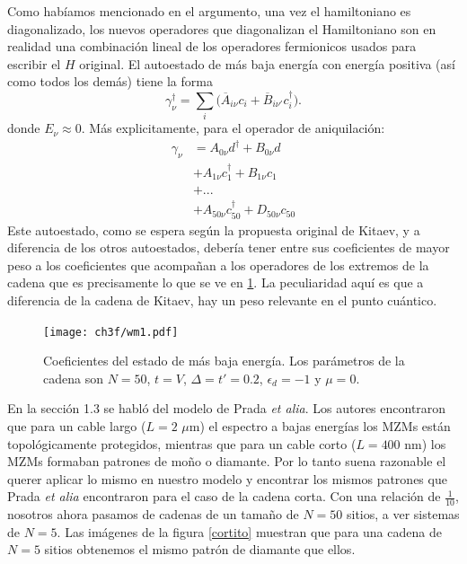Como hab\'{i}amos mencionado en el argumento, una vez el hamiltoniano es diagonalizado, los nuevos operadores que diagonalizan el Hamiltoniano son en realidad una combinaci\'{o}n lineal de los operadores fermionicos usados para escribir el $H$ original. El autoestado de m\'{a}s baja energ\'{i}a con energ\'{i}a positiva (as\'{i} como todos los dem\'{a}s) tiene la forma 
\begin{equation}
    \gamma_\nu^\dagger=\sum_{i}\Big( \overline{A}_{i\nu}c_{i}+\overline{B}_{i\nu'}c^\dagger_{i} \Big). 
\end{equation}
donde $E_\nu\approx 0$. M\'{a}s explicitamente, para el operador de aniquilaci\'{o}n:
\begin{equation}
    \begin{split}
        \gamma_\nu &= A_{0\nu} d^\dagger + B_{0\nu} d\\
     &+ A_{1\nu} c_1^\dagger + B_{1\nu} c_1\\
     &+ ...\\
     &+ A_{50\nu} c_{50}^\dagger + D_{50\nu} c_{50}
    \end{split} 
\end{equation}
Este autoestado, como se espera seg\'{u}n la propuesta original de Kitaev, y a diferencia de los otros autoestados, deber\'{i}a tener entre sus coeficientes de mayor peso a los coeficientes que acompa\~{n}an a los operadores de los extremos de la cadena que es precisamente lo que se ve en \ref{fig: wm1}. La peculiaridad aqu\'{i} es que a diferencia de la cadena de Kitaev, hay un peso relevante en el punto cu\'{a}ntico. 
%
%
\begin{figure}[H]
    \centering
    \texttt{[image: ch3f/wm1.pdf]}
    \caption{Coeficientes del estado de m\'{a}s baja energ\'{i}a. Los par\'{a}metros de la cadena son $N=50$, $t=V$, $\Delta=t'=0.2$, $\epsilon_d=-1$ y $\mu=0$.}
    \label{fig: wm1}
\end{figure}
En la secci\'{o}n 1.3 se habl\'{o} del modelo de Prada \emph{et alia}. Los autores encontraron que para un cable largo ($L=2$ $\mu$m) el espectro a bajas energ\'{i}as los MZMs est\'{a}n topol\'{o}gicamente protegidos, mientras que para un cable corto ($L=400$ nm) los MZMs formaban patrones de mo\~{n}o o diamante. Por lo tanto suena razonable el querer aplicar lo mismo en nuestro modelo y encontrar los mismos patrones que Prada \emph{et alia} encontraron para el caso de la cadena corta. Con una relaci\'{o}n de $\frac{1}{10}$, nosotros ahora pasamos de cadenas de un tama\~{n}o de $N=50$ sitios, a ver sistemas de $N=5$. Las im\'{a}genes de la figura \ref{cortito} muestran que para una cadena de $N=5$ sitios obtenemos el mismo patr\'{o}n de diamante que ellos. 

